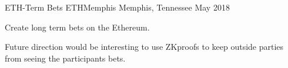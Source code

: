 \begin{cventries}
	\cventry
	{ETH-Term Bets} %
	{ETHMemphis} %
	{Memphis, Tennessee} %
	{May 2018} %
	{
		\begin{cvitems} %
			\item {Create long term bets on the Ethereum.}
			\item {Future direction would be interesting to use ZKproofs to keep
					outside parties from seeing the participants bets.}
		\end{cvitems}
	}

\end{cventries}
